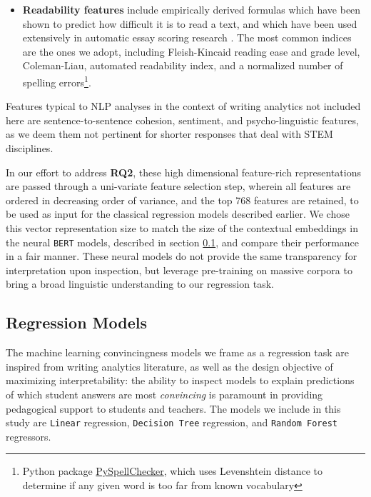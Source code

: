 \documentclass[notitlepage,12pt]{jedm}
\begin{document}
\begin{itemize}
	\item \textbf{Readability features} include empirically derived formulas which have 
	been shown to predict how difficult it is to read a text, and which have been 
	used extensively in automatic essay scoring research 
	\cite{graesser_coh-metrix:_2004}.
	The most common indices are the ones we adopt, including  
	Fleish-Kincaid reading ease and grade level,
	Coleman-Liau,
	automated readability index, and 
	a normalized number of spelling errors\footnote{Python package 
	\href{https://pypi.org/project/pyspellchecker/}{PySpellChecker}, 
	which uses Levenshtein distance to determine if any given word is too far 
	from known vocabulary}. 

	
\end{itemize}

Features typical to NLP analyses in the context of writing analytics 
not included here are sentence-to-sentence cohesion, sentiment, and 
psycho-linguistic features, as we deem them not pertinent for shorter responses 
that deal with STEM disciplines.

In our effort to address \textbf{RQ2}, these high dimensional 
feature-rich representations are passed through a uni-variate feature selection 
step, wherein all features are ordered in decreasing order of variance, and the 
top 768 features are retained, to be used as input for the classical regression 
models described earlier.  
We chose this vector representation size to match the size of the contextual 
embeddings in the neural \verb|BERT| models, described in section 
\ref{sec:regress_models}, and compare their performance in a fair manner.
These neural models do not provide the same transparency for interpretation 
upon inspection, but leverage pre-training on massive corpora to bring a broad 
linguistic understanding to our regression task.


\subsection{Regression Models}\label{sec:regress_models}

The machine learning convincingness models we frame as a regression task are
inspired from writing analytics literature, as well as the design objective of 
maximizing interpretability: the ability to inspect models to explain 
predictions of which student answers are most \textit{convincing} is paramount 
in providing pedagogical support to students and teachers.
The models we include in this study are \verb|Linear| regression, 
\verb|Decision Tree| regression, and \verb|Random Forest| regressors.
\end{document}
